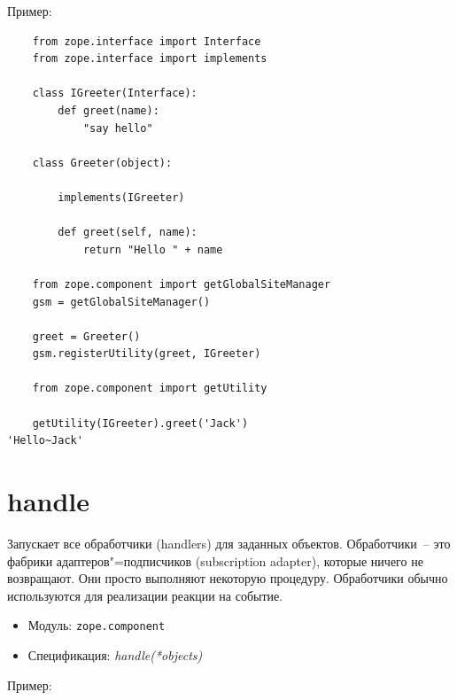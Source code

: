 \documentclass[a4paper,openany,twoside,draft]{book}
\providecommand*{\DUroletitlereference}[1]{\textsl{#1}}
\begin{document}
Пример:

\begin{verbatim}
    from zope.interface import Interface
    from zope.interface import implements

    class IGreeter(Interface):
        def greet(name):
            "say hello"

    class Greeter(object):

        implements(IGreeter)

        def greet(self, name):
            return "Hello " + name

    from zope.component import getGlobalSiteManager
    gsm = getGlobalSiteManager()

    greet = Greeter()
    gsm.registerUtility(greet, IGreeter)

    from zope.component import getUtility

    getUtility(IGreeter).greet('Jack')
'Hello~Jack'
\end{verbatim}


\section*{handle%
  \label{handle}%
}

Запускает все обработчики (handlers) для заданных объектов.  Обработчики~-- это фабрики адаптеров"=подписчиков (subscription adapter), которые ничего не возвращают.  Они просто выполняют некоторую процедуру.  Обработчики обычно используются для реализации реакции на событие.

\begin{itemize}

\item Модуль: \texttt{zope.component}

\item Спецификация: \DUroletitlereference{handle(*objects)}

\end{itemize}

Пример:
\end{document}
